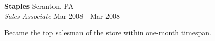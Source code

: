 \textbf{Staples} \hfill Scranton, PA\\
\textit{Sales Associate} \hfill Mar 2008 - Mar 2008\\
\vspace*{-4pt}
\begin{achievements}
	\item Became the top salesman of the store within one-month timespan.
\end{achievements}
